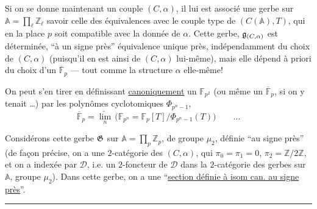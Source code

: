 Si on se donne maintenant un couple $(C,\alpha)$, il lui est associé une  gerbe sur
$\mathbb A=\prod_\ell\mathbb Z_\ell$ 
savoir celle des équivalences  avec le  couple type de $(C(\mathbb A),T)$, qui en la place $p$ soit compatible avec la donnée de $\alpha$.
Cette gerbe, $\mathfrak g_{(C,\alpha)}$ est déterminée, ``à un signe près''  équivalence unique près, indépendamment du choix de $(C,\alpha)$ (puisqu'il en est ainsi de $(C,\alpha)$ lui-même), 
mais elle dépend à priori  du choix d'un $\overline{\mathbb F}_p$
--- tout comme la structure $\alpha$ elle-même!


On peut s'en tirer en définissant \uline{canoniquement} un $\mathbb F_{p^2}$ (ou même un $\overline{\mathbb F}_p$, si on y tenait \ldots) par les polynômes cyclotomiques $\Phi_{p^n-1}$,
\[
\overline{\mathbb F}_p=
\underset{n}{\underrightarrow{\lim}}\,
\bigl(\mathbb F_{p^n}=\mathbb F_p[T]/\Phi_{p^n-1}(T)\bigr)
\qquad\ldots
\]


Considérons cette gerbe $\mathfrak G$ sur $\mathbb A=\prod_p\mathbb Z_p$, de groupe $\mu_2$, définie ``au signe près'' (de façon précise, on a une $2$-catégorie des $(C,\alpha)$, qui  $\pi_0=\pi_1=0$, $\pi_2=\mathbb Z/2\mathbb Z$, et  on a   indexée par $\mathcal D$, i.e. un $2$-foncteur de $\mathcal D$ dans la $2$-catégorie des gerbes sur $\mathbb A$, groupe $\mu_2$).
Dans cette gerbe, on a une ``\uline{section définie à isom can. au signe près}''.


\medskip
\hrule
\medskip

